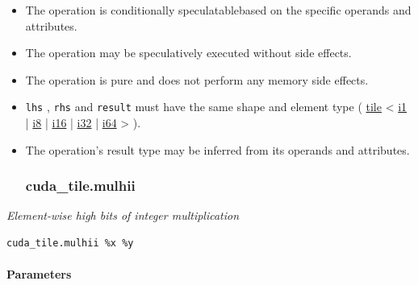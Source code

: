 \documentclass{article}
\begin{document}
\begin{itemize}
\item The operation is conditionally speculatablebased on the specific operands and attributes.
\item The operation may be speculatively executed without side effects.
\item The operation is pure and does not perform any memory side effects.
\item \texttt{lhs} , \texttt{rhs} and \texttt{result} must have the same shape and element type ( \href{https://docs.nvidia.com/cuda/tile-ir/latest/sections/types.html#type-tile}{tile} < \href{https://docs.nvidia.com/cuda/tile-ir/latest/sections/types.html#subsection-element-types}{i1} | \href{https://docs.nvidia.com/cuda/tile-ir/latest/sections/types.html#subsection-element-types}{i8} | \href{https://docs.nvidia.com/cuda/tile-ir/latest/sections/types.html#subsection-element-types}{i16} | \href{https://docs.nvidia.com/cuda/tile-ir/latest/sections/types.html#subsection-element-types}{i32} | \href{https://docs.nvidia.com/cuda/tile-ir/latest/sections/types.html#subsection-element-types}{i64} > ).
\item The operation's result type may be inferred from its operands and attributes.


\subsubsection{cuda\_tile.mulhii}

\end{itemize}
\textit{Element-wise high bits of integer multiplication}


\begin{lstlisting}
cuda_tile.mulhii %x %y
\end{lstlisting}

\paragraph{Parameters}
\end{document}
